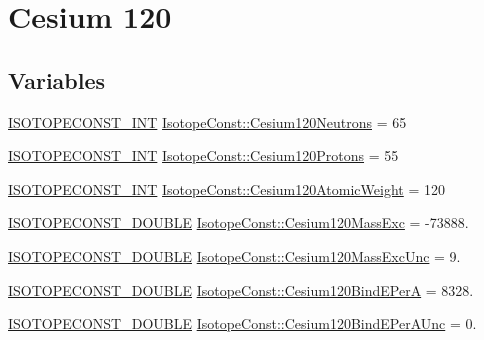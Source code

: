 \hypertarget{group___isotope_const-_cesium-_cs120}{}\section{Cesium 120}
\label{group___isotope_const-_cesium-_cs120}
\subsection*{Variables}
\begin{DoxyCompactItemize}
\item 
\mbox{\hyperlink{group___isotope_const-_macros_ga5f18360b3e99483a35c32d789e62621c}{I\+S\+O\+T\+O\+P\+E\+C\+O\+N\+S\+T\+\_\+\+I\+NT}} \mbox{\hyperlink{group___isotope_const-_cesium-_cs120_gacf15987f980cf88f35f2890f6a09b06c}{Isotope\+Const\+::\+Cesium120\+Neutrons}} = 65
\item 
\mbox{\hyperlink{group___isotope_const-_macros_ga5f18360b3e99483a35c32d789e62621c}{I\+S\+O\+T\+O\+P\+E\+C\+O\+N\+S\+T\+\_\+\+I\+NT}} \mbox{\hyperlink{group___isotope_const-_cesium-_cs120_ga95f5e1131a3a291c2a23c7f65b0448c6}{Isotope\+Const\+::\+Cesium120\+Protons}} = 55
\item 
\mbox{\hyperlink{group___isotope_const-_macros_ga5f18360b3e99483a35c32d789e62621c}{I\+S\+O\+T\+O\+P\+E\+C\+O\+N\+S\+T\+\_\+\+I\+NT}} \mbox{\hyperlink{group___isotope_const-_cesium-_cs120_gaeb0bf6c3edd4b16175b72688509fdbf3}{Isotope\+Const\+::\+Cesium120\+Atomic\+Weight}} = 120
\item 
\mbox{\hyperlink{group___isotope_const-_macros_ga8f45a7272ce02c0b4c65c44636ed719a}{I\+S\+O\+T\+O\+P\+E\+C\+O\+N\+S\+T\+\_\+\+D\+O\+U\+B\+LE}} \mbox{\hyperlink{group___isotope_const-_cesium-_cs120_ga74077eaa1f0ed5d16476f940cced7616}{Isotope\+Const\+::\+Cesium120\+Mass\+Exc}} = -\/73888.
\item 
\mbox{\hyperlink{group___isotope_const-_macros_ga8f45a7272ce02c0b4c65c44636ed719a}{I\+S\+O\+T\+O\+P\+E\+C\+O\+N\+S\+T\+\_\+\+D\+O\+U\+B\+LE}} \mbox{\hyperlink{group___isotope_const-_cesium-_cs120_gaf2513e99e06e1eb9a096e76bd0364ef9}{Isotope\+Const\+::\+Cesium120\+Mass\+Exc\+Unc}} = 9.
\item 
\mbox{\hyperlink{group___isotope_const-_macros_ga8f45a7272ce02c0b4c65c44636ed719a}{I\+S\+O\+T\+O\+P\+E\+C\+O\+N\+S\+T\+\_\+\+D\+O\+U\+B\+LE}} \mbox{\hyperlink{group___isotope_const-_cesium-_cs120_gae5f666b0d3164c042156a6070896f43f}{Isotope\+Const\+::\+Cesium120\+Bind\+E\+PerA}} = 8328.
\item 
\mbox{\hyperlink{group___isotope_const-_macros_ga8f45a7272ce02c0b4c65c44636ed719a}{I\+S\+O\+T\+O\+P\+E\+C\+O\+N\+S\+T\+\_\+\+D\+O\+U\+B\+LE}} \mbox{\hyperlink{group___isotope_const-_cesium-_cs120_gad02e140bc3ada6620d10e2f7dd365c45}{Isotope\+Const\+::\+Cesium120\+Bind\+E\+Per\+A\+Unc}} = 0.

\end{DoxyCompactItemize}
